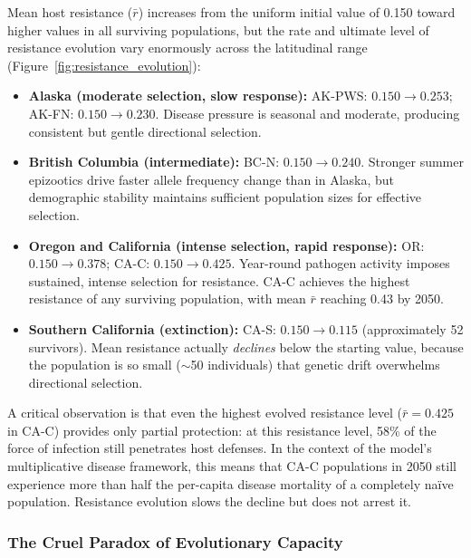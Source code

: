Mean host resistance ($\bar{r}$) increases from the uniform initial
value of 0.150 toward higher values in all surviving populations, but
the rate and ultimate level of resistance evolution vary enormously
across the latitudinal range
(Figure~\ref{fig:resistance_evolution}):

\begin{itemize}
  \item \textbf{Alaska (moderate selection, slow response):}
    AK-PWS: $0.150 \rightarrow 0.253$;
    AK-FN: $0.150 \rightarrow 0.230$.
    Disease pressure is seasonal and moderate, producing
    consistent but gentle directional selection.
  \item \textbf{British Columbia (intermediate):}
    BC-N: $0.150 \rightarrow 0.240$.
    Stronger summer epizootics drive faster allele frequency
    change than in Alaska, but demographic stability maintains
    sufficient population sizes for effective selection.
  \item \textbf{Oregon and California (intense selection, rapid
    response):}
    OR: $0.150 \rightarrow 0.378$;
    CA-C: $0.150 \rightarrow 0.425$.
    Year-round pathogen activity imposes sustained, intense
    selection for resistance.  CA-C achieves the highest
    resistance of any surviving population, with mean $\bar{r}$
    reaching 0.43 by 2050.
  \item \textbf{Southern California (extinction):}
    CA-S: $0.150 \rightarrow 0.115$ (approximately 52 survivors).
    Mean resistance actually \textit{declines} below the starting
    value, because the population is so small (${\sim}$50 individuals)
    that genetic drift overwhelms directional selection.
\end{itemize}

\noindent
A critical observation is that even the highest evolved resistance
level ($\bar{r} = 0.425$ in CA-C) provides only partial protection:
at this resistance level, 58\% of the force of infection still
penetrates host defenses.  In the context of the model's multiplicative
disease framework, this means that CA-C populations in 2050 still
experience more than half the per-capita disease mortality of a
completely na\"ive population.  Resistance evolution slows the decline
but does not arrest it.

\subsubsection{The Cruel Paradox of Evolutionary Capacity}

